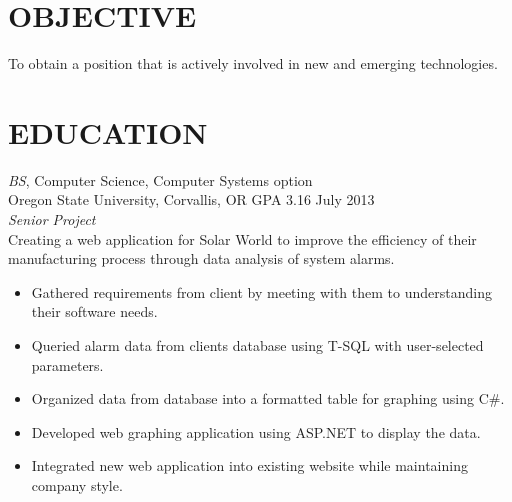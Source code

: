 \documentclass{res}
\begin{document}
\thispagestyle{empty} %

\address{1360 NW Van Buren Ave \\ Corvallis, OR 97330\\
  (503) 347-9899\\ jordanmcconnell@comcast.net }



\begin{resume}

\section{OBJECTIVE}
\vspace{8pt} %
To obtain a position that is actively involved in new and emerging technologies.
\vspace{0.2in}
\section{EDUCATION}
\vspace{8pt}
{\sl BS}, Computer Science, Computer Systems option \\
Oregon State University, Corvallis, OR \hspace{0.2in}  GPA 3.16 \hfill July 2013 \\

{\sl Senior Project}\\
Creating a web application for Solar World to improve the efficiency of their manufacturing process through data analysis of system alarms.
    \begin{itemize} \itemsep -2pt
    \item Gathered requirements from client by meeting with them to understanding their software needs.
    \item Queried alarm data from clients database using T-SQL with user-selected parameters.
    \item Organized data from database into a formatted table for graphing using C\#.
    \item Developed web graphing application using ASP.NET to display the data.
    \item Integrated new web application into existing website while maintaining company style.
    \end{itemize}


\end{resume}
\end{document}
